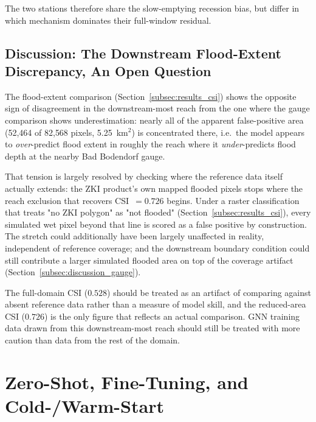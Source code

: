 \documentclass[12pt,a4paper]{report}
\begin{document}
{The two stations therefore share the slow-emptying recession bias, but differ in which
mechanism dominates their full-window residual.
 
\subsection{Discussion: The Downstream Flood-Extent Discrepancy, An Open Question}
\label{subsec:discussion_csi}
The flood-extent comparison (Section~\ref{subsec:results_csi}) shows the opposite sign
of disagreement in the downstream-most reach from the one where the gauge comparison
shows underestimation: nearly all of the apparent false-positive area (52{,}464 of
82{,}568 pixels, 5.25~km$^2$) is concentrated there, i.e.\ the model appears to
\emph{over}-predict flood extent in roughly the reach where it \emph{under}-predicts
flood depth at the nearby Bad Bodendorf gauge.
 
That tension is largely resolved by checking where the reference data itself actually
extends: the ZKI product's own mapped flooded pixels stops where the
reach exclusion that recovers CSI~$=0.726$ begins.
Under a raster classification that treats "no ZKI polygon" as
"not flooded" (Section~\ref{subsec:results_csi}), every simulated wet pixel beyond that
line is scored as a false positive by construction. 
The stretch could additionally have been largely unaffected in reality,
independent of reference coverage; and the downstream boundary condition could still contribute a larger simulated flooded area on
top of the coverage artifact
(Section~\ref{subsec:discussion_gauge}). 
 
The full-domain CSI ($0.528$) should be treated as an artifact of comparing against absent
reference data rather than a measure of model skill, and the reduced-area CSI
($0.726$) is the only figure that reflects an actual comparison. GNN training data
drawn from this downstream-most reach should still be treated with more caution than
data from the rest of the domain.


 
 
\section{Zero-Shot, Fine-Tuning, and Cold-/Warm-Start}
\label{sec:zeroshot-finetune-coldwarm}
 
}
\end{document}
